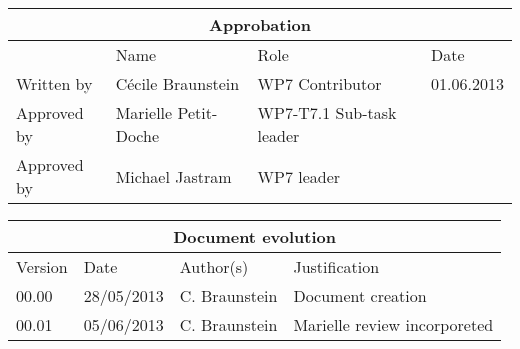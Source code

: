 \documentclass{openetcs_report}
\begin{document}
\begin{tabular}{|p{2.2cm}|p{4cm}|p{4cm}|p{2cm}|}
\hline
\multicolumn{4}{|c|}{Approbation} \\
\hline
  &  Name & Role & Date   \\
\hline  
Written by    &  C\'ecile Braunstein & WP7 Contributor  & 01.06.2013 \\
\hline
Approved by & Marielle Petit-Doche & WP7-T7.1 Sub-task  leader & \\
\hline
Approved by & Michael Jastram & WP7 leader & \\
\hline
\end{tabular}

\begin{tabular}{|p{2.2cm}|p{2cm}|p{3cm}|p{5cm}|}
\hline
\multicolumn{4}{|c|}{Document evolution} \\
\hline
Version &  Date & Author(s) & Justification  \\
\hline  
00.00 & 28/05/2013 & C. Braunstein &  Document creation  \\
00.01 & 05/06/2013 & C. Braunstein &  Marielle review incorporeted  \\
\hline  

\end{tabular}



\newcommand{\tbd}{\colorbox{cyan}{\%\%To Be Defined\%\%}}
\newcommand{\tbc}{\colorbox{cyan}{\%\%To Be Confirmed\%\%}}
\newcommand{\todo}[1]{\colorbox{cyan}{\%\%{#1}\%\%}}
\newlength{\origindent}

\newenvironment{issue}{
        \begin{quote}
        \begin{itshape}Open Issue.
}{
        \end{itshape}
        \end{quote}
}

\newenvironment{comment}{
        \begin{quote}
        \begin{itshape}Comment.
}{
        \end{itshape}
        \end{quote}
}

\newenvironment{justif}{
        \begin{quote}
        \begin{itshape}Justification.
}{
        \end{itshape}
        \end{quote}
}
\end{document}
